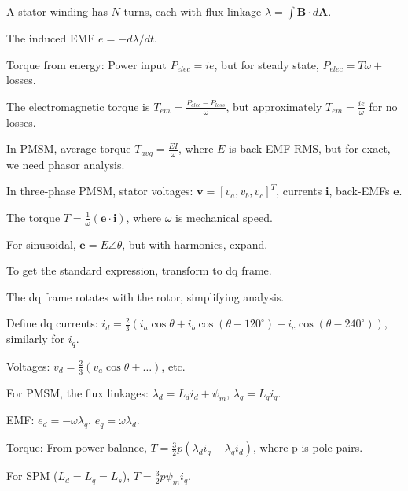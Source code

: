 \documentclass[12pt, a4paper]{article}
\begin{document}
\begin{circuitbox}
A stator winding has \(N\) turns, each with flux linkage \(\lambda = \int \mathbf{B} \cdot d\mathbf{A}\).

The induced EMF \(e = -d\lambda/dt\).

Torque from energy: Power input \(P_{elec} = i e\), but for steady state, \(P_{elec} = T \omega +\) losses.

The electromagnetic torque is \(T_{em} = \frac{P_{elec} - P_{loss}}{\omega}\), but approximately \(T_{em} = \frac{i e}{\omega}\) for no losses.

In PMSM, average torque \(T_{avg} = \frac{E I}{\omega}\), where \(E\) is back-EMF RMS, but for exact, we need phasor analysis.
\end{circuitbox}

\begin{statebox}
In three-phase PMSM, stator voltages: \(\mathbf{v} = [v_a, v_b, v_c]^T\), currents \(\mathbf{i}\), back-EMFs \(\mathbf{e}\).

The torque \(T = \frac{1}{\omega} (\mathbf{e} \cdot \mathbf{i})\), where \(\omega\) is mechanical speed.

For sinusoidal, \(\mathbf{e} = E \angle \theta\), but with harmonics, expand.

To get the standard expression, transform to dq frame.
\end{statebox}

\begin{eqnbox}
The dq frame rotates with the rotor, simplifying analysis.

Define dq currents: \(i_d = \frac{2}{3} (i_a \cos\theta + i_b \cos(\theta - 120^\circ) + i_c \cos(\theta - 240^\circ))\), similarly for \(i_q\).

Voltages: \(v_d = \frac{2}{3} (v_a \cos\theta + \dots)\), etc.

For PMSM, the flux linkages: \(\lambda_d = L_d i_d + \psi_m\), \(\lambda_q = L_q i_q\).

EMF: \(e_d = -\omega \lambda_q\), \(e_q = \omega \lambda_d\).

Torque: From power balance, \(T = \frac{3}{2} p (\lambda_d i_q - \lambda_q i_d)\), where p is pole pairs.

For SPM (\(L_d = L_q = L_s\)), \(T = \frac{3}{2} p \psi_m i_q\).
\end{eqnbox}
\end{document}
